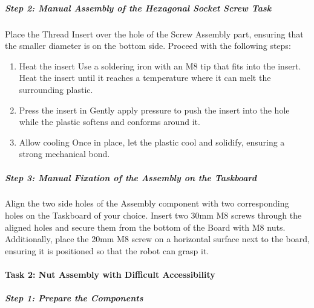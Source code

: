 \documentclass[letterpaper,10pt,english]{sphinxmanual}
\let\sphinxpxdimen\pdfpxdimen\else\newdimen\sphinxpxdimen
\begin{document}
\subparagraph{Step 2: Manual Assembly of the Hexagonal Socket Screw Task}
\label{\detokenize{4-Assembly-Instructions-Screws-and-Nuts:step-2-manual-assembly-of-the-hexagonal-socket-screw-task}}
\sphinxAtStartPar
Place the Thread Insert over the hole of the Screw Assembly part, ensuring that the smaller diameter is on the bottom side.
Proceed with the following steps:
\begin{enumerate}
%
\item {} 
\sphinxAtStartPar
Heat the insert \textendash{} Use a soldering iron with an M8 tip that fits into the insert. Heat the insert until it reaches a temperature where it can melt the surrounding plastic.

\item {} 
\sphinxAtStartPar
Press the insert in \textendash{} Gently apply pressure to push the insert into the hole while the plastic softens and conforms around it.

\item {} 
\sphinxAtStartPar
Allow cooling \textendash{} Once in place, let the plastic cool and solidify, ensuring a strong mechanical bond.

\end{enumerate}

\noindent{\hspace*{\fill}\sphinxincludegraphics[width=200\sphinxpxdimen]{{screw_assembly_heat_insert}.png}\hspace*{\fill}}


\subparagraph{Step 3: Manual Fixation of the Assembly on the Taskboard}
\label{\detokenize{4-Assembly-Instructions-Screws-and-Nuts:step-3-manual-fixation-of-the-assembly-on-the-taskboard}}
\sphinxAtStartPar
Align the two side holes of the Assembly component with two corresponding holes on the Taskboard of your choice. Insert two 30mm M8 screws through the aligned holes and secure them from the bottom of the Board with M8 nuts.
Additionally, place the 20mm M8 screw on a horizontal surface next to the board, ensuring it is positioned so that the robot can grasp it.


\paragraph{Task 2: Nut Assembly with Difficult Accessibility}
\label{\detokenize{4-Assembly-Instructions-Screws-and-Nuts:task-2-nut-assembly-with-difficult-accessibility}}

\subparagraph{Step 1: Prepare the Components}
\label{\detokenize{4-Assembly-Instructions-Screws-and-Nuts:id1}}
\end{document}
